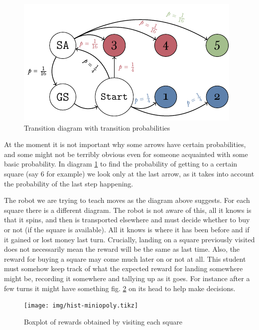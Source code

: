 \begin{figure}[h]
	\centering
	\includegraphics[width=\textwidth]{img/transicion-markov.pdf}
	\caption{Transition diagram with transition probabilities}
	\label{fig:miniopoly-transicion-markov}
\end{figure}

At the moment it is not important why some arrows have certain 
probabilities, and some might not be terribly obvious even for 
someone acquainted with some basic probability. In diagram 
\ref{fig:miniopoly-transicion-markov} to find the probability 
of getting to a certain square (say 6 for example) we look only 
at the last arrow, as it takes into account the probability of 
the last step happening.

The robot we are trying to teach moves as the diagram above 
suggests. For each square there is a different diagram. The 
robot is not aware of this, all it knows is that it spins, and 
then is transported elsewhere and must decide whether to buy or 
not (if the square is available). All it knows is where it has 
been before and if it gained or lost money last turn. 
Crucially, landing on a square previously visited does not 
necessarily mean the reward will be the same as last time. 
Also, the reward for buying a square may come much later on or 
not at all. This student must somehow keep track of what the 
expected reward for landing somewhere might be, recording it 
somewhere and tallying up as it goes. For instance after a few 
turns it might have something fig. \ref{fig:hist-miniopoly} on 
its head to help make decisions.

\begin{figure}
\centering
\texttt{[image: img/hist-miniopoly.tikz]}
\label{fig:hist-miniopoly}
\caption{Boxplot of rewards obtained by visiting each square}
\end{figure}

